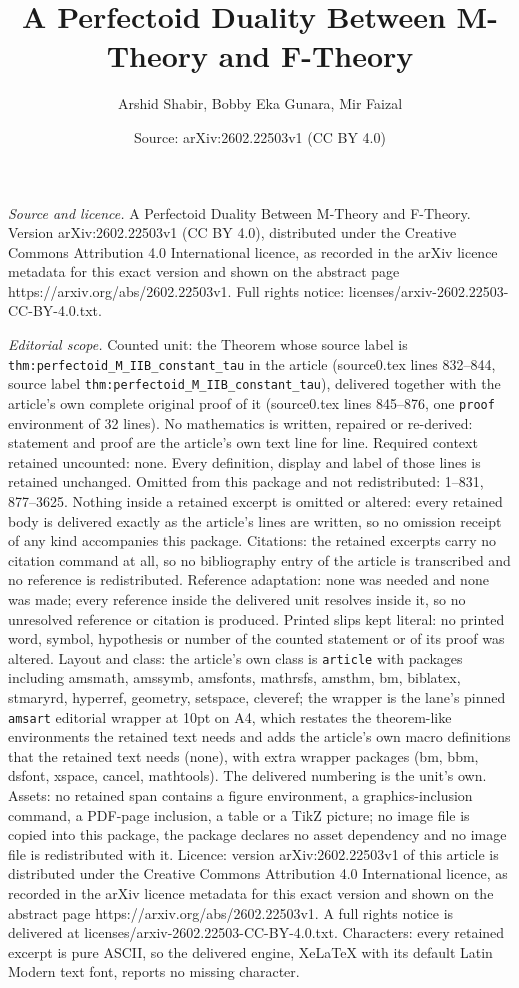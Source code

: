 \documentclass[10pt,a4paper]{amsart}
\title[A Perfectoid Duality Between M-Theory and F-Theory]{A Perfectoid Duality Between M-Theory and F-Theory}
\author{Arshid Shabir, Bobby Eka Gunara, Mir Faizal}
\date{Source: arXiv:2602.22503v1 (CC BY 4.0)}
\begin{document}
\maketitle

\noindent\emph{Source and licence.} A Perfectoid Duality Between M-Theory and F-Theory. Version arXiv:2602.22503v1 (CC BY 4.0), distributed under the Creative Commons Attribution 4.0 International licence, as recorded in the arXiv licence metadata for this exact version and shown on the abstract page https://arxiv.org/abs/2602.22503v1. Full rights notice: licenses/arxiv-2602.22503-CC-BY-4.0.txt.\par\smallskip

\noindent\textit{Editorial scope.} Counted unit: the Theorem whose source label is \texttt{thm:perfectoid\_M\_IIB\_constant\_tau} in the article (source0.tex lines 832--844, source label \texttt{thm:perfectoid\_M\_IIB\_constant\_tau}), delivered together with the article's own complete original proof of it (source0.tex lines 845--876, one \texttt{proof} environment of 32 lines). No mathematics is written, repaired or re-derived: statement and proof are the article's own text line for line. Required context retained uncounted: none. Every definition, display and label of those lines is retained unchanged. Omitted from this package and not redistributed: 1--831, 877--3625. Nothing inside a retained excerpt is omitted or altered: every retained body is delivered exactly as the article's lines are written, so no omission receipt of any kind accompanies this package. Citations: the retained excerpts carry no citation command at all, so no bibliography entry of the article is transcribed and no reference is redistributed. Reference adaptation: none was needed and none was made; every reference inside the delivered unit resolves inside it, so no unresolved reference or citation is produced. Printed slips kept literal: no printed word, symbol, hypothesis or number of the counted statement or of its proof was altered. Layout and class: the article's own class is \texttt{article} with packages including amsmath, amssymb, amsfonts, mathrsfs, amsthm, bm, biblatex, stmaryrd, hyperref, geometry, setspace, cleveref; the wrapper is the lane's pinned \texttt{amsart} editorial wrapper at 10pt on A4, which restates the theorem-like environments the retained text needs and adds the article's own macro definitions that the retained text needs (none), with extra wrapper packages (bm, bbm, dsfont, xspace, cancel, mathtools). The delivered numbering is the unit's own. Assets: no retained span contains a figure environment, a graphics-inclusion command, a PDF-page inclusion, a table or a TikZ picture; no image file is copied into this package, the package declares no asset dependency and no image file is redistributed with it. Licence: version arXiv:2602.22503v1 of this article is distributed under the Creative Commons Attribution 4.0 International licence, as recorded in the arXiv licence metadata for this exact version and shown on the abstract page https://arxiv.org/abs/2602.22503v1. A full rights notice is delivered at licenses/arxiv-2602.22503-CC-BY-4.0.txt. Characters: every retained excerpt is pure ASCII, so the delivered engine, XeLaTeX with its default Latin Modern text font, reports no missing character.
\end{document}
